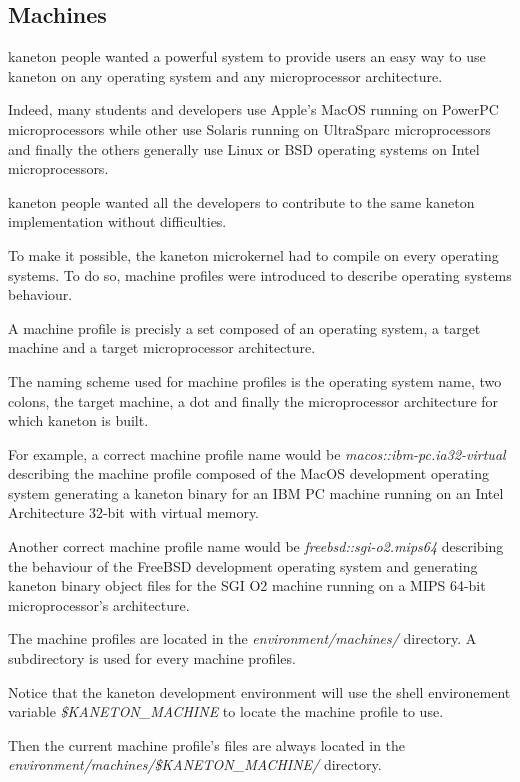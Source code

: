 %
%

\subsection{Machines}

kaneton people wanted a powerful system to provide users an easy way
to use kaneton on any operating system and any microprocessor architecture.

Indeed, many students and developers use Apple's MacOS running on PowerPC
microprocessors while other use Solaris running on UltraSparc microprocessors
and finally the others generally use Linux or BSD operating systems on
Intel microprocessors.

kaneton people wanted all the developers to contribute to the same
kaneton implementation without difficulties.

To make it possible, the kaneton microkernel had to compile on
every operating systems. To do so, machine profiles were introduced to
describe operating systems behaviour.

A machine profile is precisly a set composed of an operating system,
a target machine and a target microprocessor architecture.

The naming scheme used for machine profiles is the operating system name,
two colons, the target machine, a dot and finally the microprocessor
architecture for which kaneton is built.

For example, a correct machine profile name would be
\textit{macos::ibm-pc.ia32-virtual} describing the machine profile composed
of the MacOS development operating system generating a kaneton binary for
an IBM PC machine running on an Intel Architecture 32-bit with virtual memory.

Another correct machine profile name would be \textit{freebsd::sgi-o2.mips64}
describing the behaviour of the FreeBSD development operating system and
generating kaneton binary object files for the SGI O2 machine running on
a MIPS 64-bit microprocessor's architecture.

The machine profiles are located in the \textit{environment/machines/} directory.
A subdirectory is used for every machine profiles.

Notice that the kaneton development environment will use the shell
environement variable \textit{\$KANETON\_MACHINE} to locate the
machine profile to use.

Then the current machine profile's files are always located in the
\textit{environment/machines/\$KANETON\_MACHINE/} directory.

